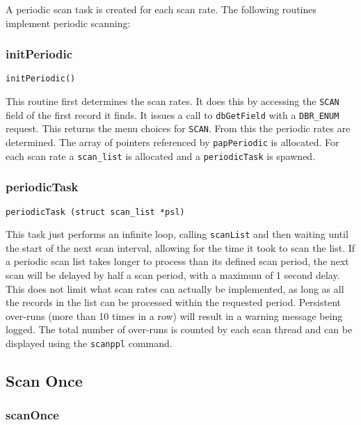 A periodic scan task is created for each scan rate.
The following routines implement periodic scanning:

\subsubsection{initPeriodic}

\begin{verbatim}
initPeriodic()
\end{verbatim}

This routine first determines the scan rates.
It does this by accessing the \verb|SCAN| field of the first record it finds.
It issues a call to \verb|dbGetField| with a \verb|DBR_ENUM| request.
This returns the menu choices for \verb|SCAN|.
From this the periodic rates are determined.
The array of pointers referenced by \verb|papPeriodic| is allocated.
For each scan rate a \verb|scan_list| is allocated and a \verb|periodicTask| is spawned.

\subsubsection{periodicTask}

\begin{verbatim}
periodicTask (struct scan_list *psl)
\end{verbatim}

This task just performs an infinite loop, calling \verb|scanList| and then waiting until the start of the next scan interval, allowing for the time it took to scan the list.
If a periodic scan list takes longer to process than its defined scan period, the next scan will be delayed by half a scan period, with a maximum of 1 second delay.
This does not limit what scan rates can actually be implemented, as long as all the records in the list can be processed within the requested period.
Persistent over-runs (more than 10 times in a row) will result in a warning message being logged.
The total number of over-runs is counted by each scan thread and can be displayed using the \verb|scanppl| command.

\subsection{Scan Once}

\subsubsection{scanOnce}


